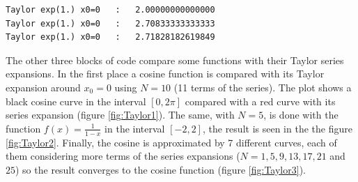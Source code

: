 \begin{verbatim}
Taylor exp(1.) x0=0   :   2.00000000000000
Taylor exp(1.) x0=0   :   2.70833333333333
Taylor exp(1.) x0=0   :   2.71828182619849
\end{verbatim}
   
The other three blocks of code compare some functions with their Taylor series expansions. In the first place a cosine function is compared with its Taylor expansion around $x_0 = 0$ using $N = 10$ (11 terms of the series). The plot shows a black cosine curve in the interval $\left[0,2\pi\right]$ compared with a red curve with its series expansion (figure \ref{fig:Taylor1}). The same, with $N = 5$, is done with the function $f(x) = \frac{1}{1-x}$ in the interval $\left[-2,2\right]$, the result is seen in the the figure \ref{fig:Taylor2}. Finally, the cosine is approximated by 7 different curves, each of them considering more terms of the series expansions ($N = 1, 5, 9, 13, 17, 21$ and $25$) so the result converges to the cosine function (figure \ref{fig:Taylor3}). 

